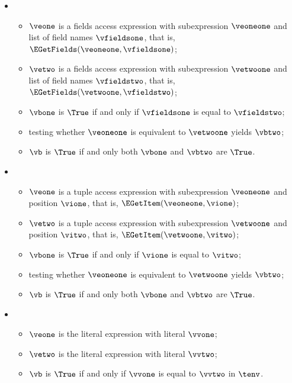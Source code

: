 \begin{itemize}
  \item {}
  \begin{itemize}
    \item $\veone$ is a fields access expression with subexpression $\veoneone$ and list of field names $\vfieldsone$,
          that is, $\EGetFields(\veoneone, \vfieldsone)$;
    \item $\vetwo$ is a fields access expression with subexpression $\vetwoone$ and list of field names $\vfieldstwo$,
          that is, $\EGetFields(\vetwoone, \vfieldstwo)$;
    \item $\vbone$ is $\True$ if and only if $\vfieldsone$ is equal to $\vfieldstwo$;
    \item testing whether $\veoneone$ is equivalent to $\vetwoone$ yields $\vbtwo$\ProseOrTypeError;
    \item $\vb$ is $\True$ if and only both $\vbone$ and $\vbtwo$ are $\True$.
  \end{itemize}

  \item {}
  \begin{itemize}
    \item $\veone$ is a tuple access expression with subexpression $\veoneone$ and position $\vione$,
          that is, $\EGetItem(\veoneone, \vione)$;
    \item $\vetwo$ is a tuple access expression with subexpression $\vetwoone$ and position $\vitwo$,
          that is, $\EGetItem(\vetwoone, \vitwo)$;
    \item $\vbone$ is $\True$ if and only if $\vione$ is equal to $\vitwo$;
    \item testing whether $\veoneone$ is equivalent to $\vetwoone$ yields $\vbtwo$\ProseOrTypeError;
    \item $\vb$ is $\True$ if and only both $\vbone$ and $\vbtwo$ are $\True$.
  \end{itemize}

  \item {}
  \begin{itemize}
    \item $\veone$ is the literal expression with literal $\vvone$;
    \item $\vetwo$ is the literal expression with literal $\vvtwo$;
    \item $\vb$ is $\True$ if and only if $\vvone$ is equal to $\vvtwo$ in $\tenv$.
  \end{itemize}


\end{itemize}

